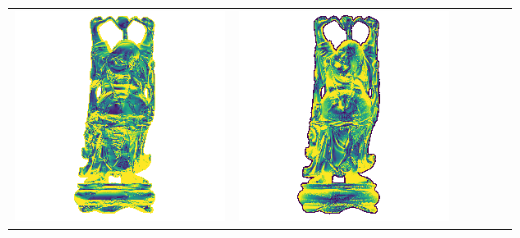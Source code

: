 \begin{tabularx}{\linewidth}{@{}Y@{}Y@{}Y@{}Y@{}Y@{}Y@{}}
\includegraphics[width=\linewidth]{semisynthetic/20160617_20_yu_err.png} &
\includegraphics[width=\linewidth]{semisynthetic/20160617_20_dpsn_err.png} &

\end{tabularx}

